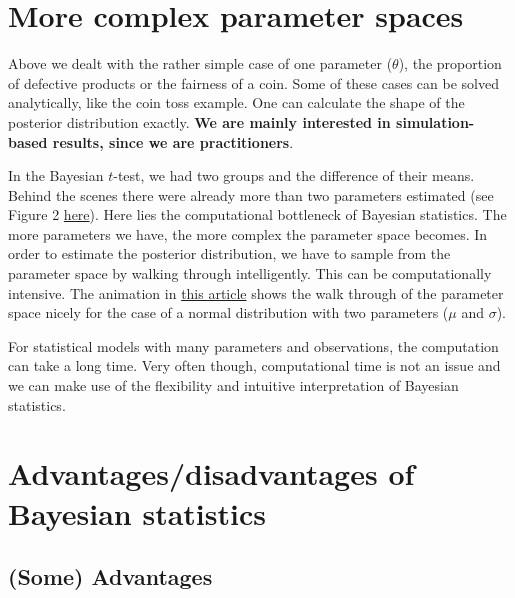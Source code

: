 \documentclass[
]{book}
\begin{document}
\section{More complex parameter spaces}\label{more-complex-parameter-spaces}

Above we dealt with the rather simple case of one parameter (\(\theta\)), the proportion of defective products or the fairness of a coin.
Some of these cases can be solved analytically, like the coin toss example. One can calculate the shape of the posterior distribution
exactly. \textbf{We are mainly interested in simulation-based results, since we are practitioners}.

In the Bayesian \(t\)-test, we had two groups and the difference of their means. Behind the scenes there were already more than two parameters
estimated (see Figure 2 \href{https://www.krigolsonteaching.com/uploads/4/3/8/4/43848243/kruschke2012jepg.pdf}{here}).
Here lies the computational bottleneck of Bayesian statistics. The more parameters we have, the more complex the parameter space becomes.
In order to estimate the posterior distribution, we have to sample from the parameter space by walking through intelligently.
This can be computationally intensive.
The animation in \href{https://mbjoseph.github.io/posts/2018-12-25-animating-the-metropolis-algorithm/}{this article}
shows the walk through of the parameter space nicely for the case of a normal distribution with two parameters (\(\mu\) and \(\sigma\)).

For statistical models with many parameters and observations, the computation can take a long time. Very often though, computational time
is not an issue and we can make use of the flexibility and intuitive interpretation of Bayesian statistics.

\section{Advantages/disadvantages of Bayesian statistics}\label{advantagesdisadvantages-of-bayesian-statistics}

\subsection{(Some) Advantages}\label{some-advantages}
\end{document}
